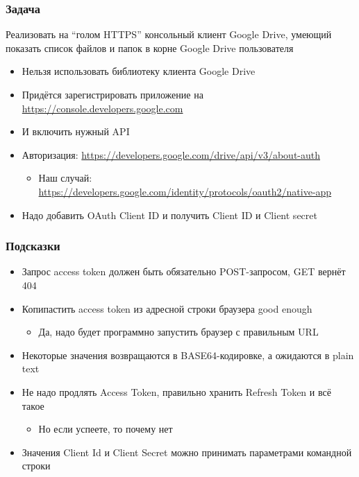 \documentclass{../mcsslides}
\begin{document}
    \begin{frame}[plain]
        \titlepage
    \end{frame}

    \begin{frame}
        \frametitle{Задача}
        Реализовать на ``голом HTTPS'' консольный клиент Google Drive, умеющий показать список файлов и папок в корне Google Drive пользователя
        \begin{itemize}
            \item Нельзя использовать библиотеку клиента Google Drive
            \item Придётся зарегистрировать приложение на \url{https://console.developers.google.com}
            \item И включить нужный API
            \item Авторизация: \url{https://developers.google.com/drive/api/v3/about-auth}
            \begin{itemize}
                \item Наш случай: \url{https://developers.google.com/identity/protocols/oauth2/native-app}
            \end{itemize}
            \item Надо добавить OAuth Client ID и получить Client ID и Client secret
        \end{itemize}
    \end{frame}

    \begin{frame}
        \frametitle{Подсказки}
        \begin{itemize}
            \item Запрос access token должен быть обязательно POST-запросом, GET вернёт 404
            \item Копипастить access token из адресной строки браузера good enough
            \begin{itemize}
                \item Да, надо будет программно запустить браузер с правильным URL
            \end{itemize}
            \item Некоторые значения возвращаются в BASE64-кодировке, а ожидаются в plain text
            \item Не надо продлять Access Token, правильно хранить Refresh Token и всё такое
            \begin{itemize}
                \item Но если успеете, то почему нет
            \end{itemize}
            \item Значения Client Id и Client Secret можно принимать параметрами командной строки
        \end{itemize}
    \end{frame}
\end{document}
